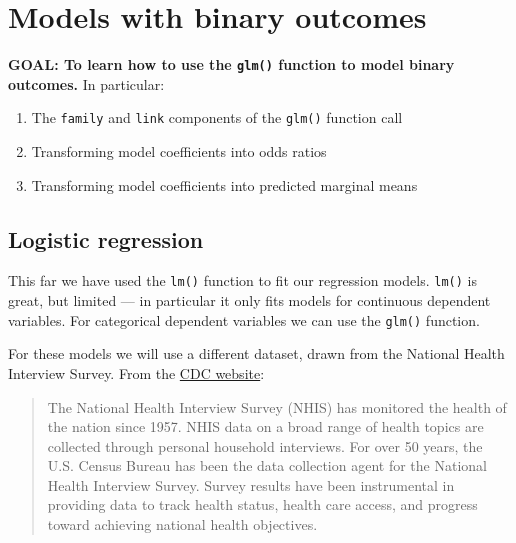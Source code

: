 \documentclass[
]{book}
\providecommand{\tightlist}{%
  \setlength{\itemsep}{0pt}\setlength{\parskip}{0pt}}
\begin{document}
\hypertarget{models-with-binary-outcomes}{%
\section{Models with binary outcomes}\label{models-with-binary-outcomes}}

\begin{alert}

\textbf{GOAL: To learn how to use the \texttt{glm()} function to model binary outcomes.} In particular:

\begin{enumerate}
\def\labelenumi{\arabic{enumi}.}
\tightlist
\item
  The \texttt{family} and \texttt{link} components of the \texttt{glm()} function call
\item
  Transforming model coefficients into odds ratios
\item
  Transforming model coefficients into predicted marginal means
\end{enumerate}

\end{alert}

\hypertarget{logistic-regression}{%
\subsection{Logistic regression}\label{logistic-regression}}

This far we have used the \texttt{lm()} function to fit our regression models. \texttt{lm()} is great, but limited --- in particular it only fits models for continuous dependent variables. For categorical dependent variables we can use the \texttt{glm()} function.

For these models we will use a different dataset, drawn from the National Health Interview Survey. From the \href{http://www.cdc.gov/nchs/nhis.htm}{CDC website}:

\begin{quote}
The National Health Interview Survey (NHIS) has monitored the health of the nation since 1957. NHIS data on a broad range of health topics are collected through personal household interviews. For over 50 years, the U.S. Census Bureau has been the data collection agent for the National Health Interview Survey. Survey results have been instrumental in providing data to track health status, health care access, and progress toward achieving national health objectives.
\end{quote}
\end{document}
